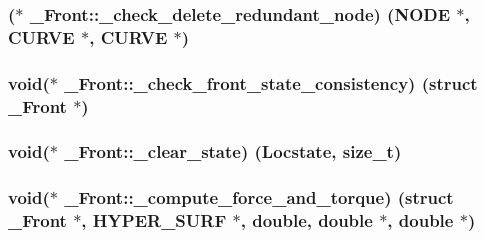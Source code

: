 \subsubsection[{\texorpdfstring{\+\_\+check\+\_\+delete\+\_\+redundant\+\_\+node}{_check_delete_redundant_node}}]{($\ast$ \+\_\+\+Front\+::\+\_\+check\+\_\+delete\+\_\+redundant\+\_\+node) ({\bf N\+O\+DE} $\ast$, {\bf C\+U\+R\+VE} $\ast$, {\bf C\+U\+R\+VE} $\ast$)}\hypertarget{struct___front_a2409af18036fdd0941ed5f9114370566}{}\label{struct___front_a2409af18036fdd0941ed5f9114370566}
\subsubsection[{\texorpdfstring{\+\_\+check\+\_\+front\+\_\+state\+\_\+consistency}{_check_front_state_consistency}}]{\setlength{\rightskip}{0pt plus 5cm}void($\ast$ \+\_\+\+Front\+::\+\_\+check\+\_\+front\+\_\+state\+\_\+consistency) (struct {\bf \+\_\+\+Front} $\ast$)}\hypertarget{struct___front_afbbaf7a0eccab9191cb1b369b7707f9f}{}\label{struct___front_afbbaf7a0eccab9191cb1b369b7707f9f}
\subsubsection[{\texorpdfstring{\+\_\+clear\+\_\+state}{_clear_state}}]{\setlength{\rightskip}{0pt plus 5cm}void($\ast$ \+\_\+\+Front\+::\+\_\+clear\+\_\+state) ({\bf Locstate}, size\+\_\+t)}\hypertarget{struct___front_aa6341b0ad11e78d10f94e49b3dd07da9}{}\label{struct___front_aa6341b0ad11e78d10f94e49b3dd07da9}
\subsubsection[{\texorpdfstring{\+\_\+compute\+\_\+force\+\_\+and\+\_\+torque}{_compute_force_and_torque}}]{\setlength{\rightskip}{0pt plus 5cm}void($\ast$ \+\_\+\+Front\+::\+\_\+compute\+\_\+force\+\_\+and\+\_\+torque) (struct {\bf \+\_\+\+Front} $\ast$, {\bf H\+Y\+P\+E\+R\+\_\+\+S\+U\+RF} $\ast$, double, double $\ast$, double $\ast$)}\hypertarget{struct___front_ae96863439bded0116ac2b342ffa994e1}{}\label{struct___front_ae96863439bded0116ac2b342ffa994e1}
